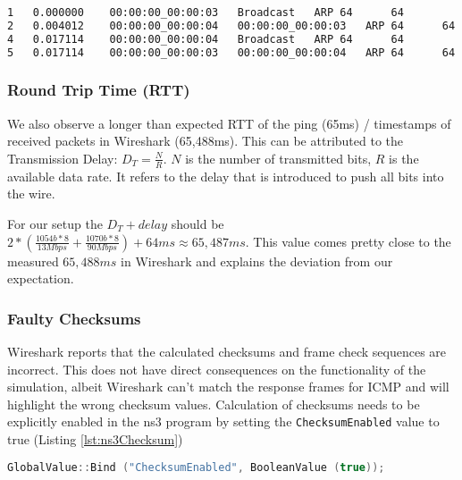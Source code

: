 \documentclass[parskip=full]{scrartcl}
\begin{document}
\begin{lstlisting}[language=tex, breaklines, frame=single, caption={ARP messages that delay the first ping}, label=lst:ns3ARP, float, floatplacement=h]
1	0.000000	00:00:00_00:00:03	Broadcast	ARP	64		64					
2	0.004012	00:00:00_00:00:04	00:00:00_00:00:03	ARP	64		64									
4	0.017114	00:00:00_00:00:04	Broadcast	ARP	64		64									
5	0.017114	00:00:00_00:00:03	00:00:00_00:00:04	ARP	64		64									
\end{lstlisting}
\subsubsection{Round Trip Time (RTT)}
We also observe a longer than expected RTT of the ping (65ms) / timestamps of received packets in Wireshark (65,488ms).
This can be attributed to the Transmission Delay: $D_T = \frac{N}{R}$.
$N$ is the number of transmitted bits, $R$ is the available data rate.
It refers to the delay that is introduced to push all bits into the wire.

For our setup the $D_T + delay$ should be $2*(\frac{1054b*8}{13Mbps} + \frac{1070b*8}{90Mbps})+64ms \approx 65,487ms$.
This value comes pretty close to the measured $65,488ms$ in Wireshark and explains the deviation from our expectation.

\subsubsection{Faulty Checksums}
Wireshark reports that the calculated checksums and frame check sequences are incorrect. 
This does not have direct consequences on the functionality of the simulation, albeit Wireshark can't match the response frames for ICMP and will highlight the wrong checksum values.
Calculation of checksums needs to be explicitly enabled in the ns3 program by setting the \texttt{ChecksumEnabled} value to true (Listing \ref{lst:ns3Checksum})

\begin{lstlisting}[language=c++, breaklines, frame=single, caption={Enable checksum calculation}, label=lst:ns3Checksum, float, floatplacement=h]
GlobalValue::Bind ("ChecksumEnabled", BooleanValue (true));
\end{lstlisting}

\end{document}
